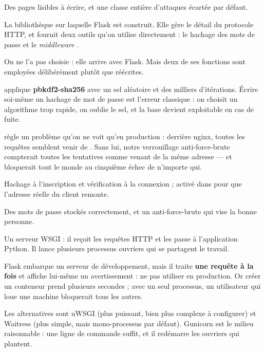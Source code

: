 \apport
Des pages lisibles à écrire, et une classe entière d'attaques écartée par
défaut.


\quoi
La bibliothèque sur laquelle Flask est construit. Elle gère le détail du
protocole HTTP, et fournit deux outils qu'on utilise directement :
le hachage des mots de passe et le \emph{middleware} .

\pourquoi
On ne l'a pas choisie : elle arrive avec Flask. Mais deux de ses fonctions sont
employées délibérément plutôt que réécrites.

 applique \textbf{pbkdf2-sha256} avec un sel
aléatoire et des milliers d'itérations. Écrire soi-même un hachage de mot de
passe est l'erreur classique : on choisit un algorithme trop rapide, on oublie
le sel, et la base devient exploitable en cas de fuite.

 règle un problème qu'on ne voit qu'en production : derrière
nginx, toutes les requêtes semblent venir de . Sans lui, notre
verrouillage anti-force-brute compterait toutes les tentatives comme venant de
la même adresse --- et bloquerait tout le monde au cinquième échec de n'importe
qui.

\role
Hachage à l'inscription et vérification à la connexion ;  activé
dans  pour que l'adresse réelle du client remonte.

\apport
Des mots de passe stockés correctement, et un anti-force-brute qui vise la
bonne personne.


\quoi
Un serveur WSGI : il reçoit les requêtes HTTP et les passe à l'application
Python. Il lance plusieurs processus ouvriers qui se partagent le travail.

\pourquoi
Flask embarque un serveur de développement, mais il traite \textbf{une requête
à la fois} et affiche lui-même un avertissement : ne pas utiliser en
production. Or créer un conteneur prend plusieurs secondes ; avec un seul
processus, un utilisateur qui loue une machine bloquerait tous les autres.

Les alternatives sont uWSGI (plus puissant, bien plus complexe à configurer) et
Waitress (plus simple, mais mono-processus par défaut). Gunicorn est le milieu
raisonnable : une ligne de commande suffit, et il redémarre les ouvriers qui
plantent.

